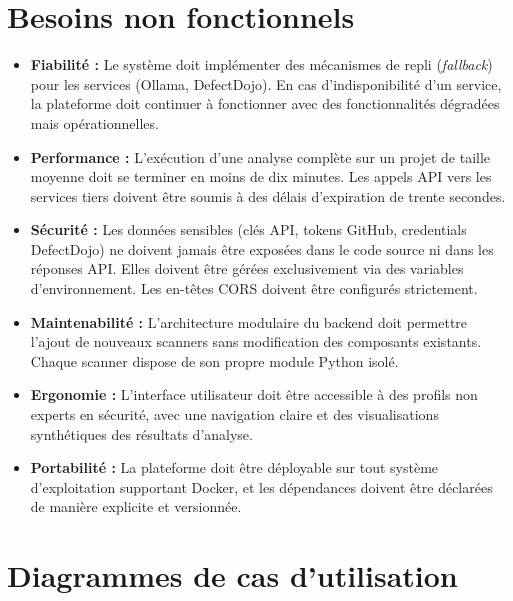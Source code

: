 \documentclass[12pt, a4paper, oneside]{report}
\begin{document}
\section{Besoins non fonctionnels}
\label{sec:besoins_non_fonctionnels}

\begin{itemize}
    \item \textbf{Fiabilité :} Le système doit implémenter des mécanismes de
    repli (\textit{fallback}) pour les services (Ollama,
    DefectDojo). En cas d'indisponibilité d'un service, la plateforme doit
    continuer à fonctionner avec des fonctionnalités dégradées mais opérationnelles.
    
    \item \textbf{Performance :} L'exécution d'une analyse complète sur un projet
    de taille moyenne doit se terminer en moins de dix minutes. Les appels API
    vers les services tiers doivent être soumis à des délais d'expiration de
    trente secondes.
    
    \item \textbf{Sécurité :} Les données sensibles (clés API, tokens GitHub,
    credentials DefectDojo) ne doivent jamais être exposées dans le code source
    ni dans les réponses API. Elles doivent être gérées exclusivement via des
    variables d'environnement. Les en-têtes CORS doivent être configurés
    strictement.
    
    \item \textbf{Maintenabilité :} L'architecture modulaire du backend doit
    permettre l'ajout de nouveaux scanners sans modification des composants
    existants. Chaque scanner dispose de son propre module Python isolé.
    
    \item \textbf{Ergonomie :} L'interface utilisateur doit être accessible à
    des profils non experts en sécurité, avec une navigation claire et des
    visualisations synthétiques des résultats d'analyse.
    
    \item \textbf{Portabilité :} La plateforme doit être déployable sur tout
    système d'exploitation supportant Docker, et les dépendances doivent être
    déclarées de manière explicite et versionnée.
\end{itemize}

\section{Diagrammes de cas d'utilisation}
\label{sec:use_cases}
\end{document}
